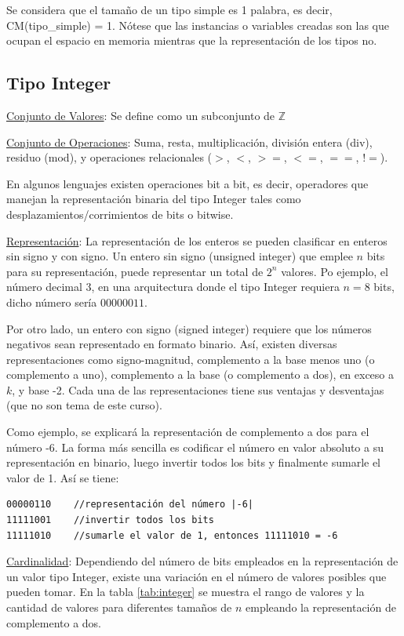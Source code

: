 Se considera que el tamaño de un tipo simple es 1 palabra, es decir, CM(tipo\_simple) = 1. Nótese que las instancias o variables creadas son las que ocupan el espacio en memoria mientras que la representación de los tipos no.

\subsection{Tipo Integer}

\underline{Conjunto de Valores}: Se define como un subconjunto de $\mathbb{Z}$

\underline{Conjunto de Operaciones}: Suma, resta, multiplicación, división entera (div), residuo (mod), y operaciones relacionales ($>$, $<$, $>=$, $<=$, $==$, $!=$).

En algunos lenguajes existen operaciones bit a bit, es decir, operadores que manejan la representación binaria del tipo Integer tales como desplazamientos/corrimientos de bits o bitwise.

\underline{Representación}: La representación de los enteros se pueden clasificar en enteros sin signo y con signo. Un entero sin signo (unsigned integer) que emplee $n$ bits para su representación, puede representar un total de $2^n$ valores. Po ejemplo, el número decimal 3, en una arquitectura donde el tipo Integer requiera $n=8$ bits, dicho número sería $00000011$.

Por otro lado, un entero con signo (signed integer) requiere que los números negativos sean representado en formato binario. Así, existen diversas representaciones como signo-magnitud, complemento a la base menos uno (o complemento a uno), complemento a la base (o complemento a dos), en exceso a $k$, y base -2. Cada una de las representaciones tiene sus ventajas y desventajas (que no son tema de este curso).

Como ejemplo, se explicará la representación de complemento a dos para el número -6. La forma más sencilla es codificar el número en valor absoluto a su representación en binario, luego invertir todos los bits y finalmente sumarle el valor de 1. Así se tiene:
\begin{lstlisting}[upquote=true,language=pseudo]
00000110 	//representación del número |-6|
11111001	//invertir todos los bits
11111010	//sumarle el valor de 1, entonces 11111010 = -6
\end{lstlisting}

\underline{Cardinalidad}: Dependiendo del número de bits empleados en la representación de un valor tipo Integer, existe una variación en el número de valores posibles que pueden tomar. En la tabla \ref{tab:integer} se muestra el rango de valores y la cantidad de valores para diferentes tamaños de $n$ empleando la representación de complemento a dos.

